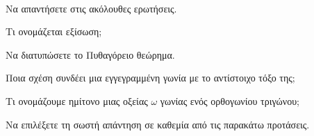 \documentclass[twoside,nofonts,internet,math,spyros]{frontisthrio-diag}
\begin{document}
\vspace{-5mm}
\begin{thema}
\item\mbox{}\\\vspace{-5mm}
\begin{erwthma}
\item Να απαντήσετε στις ακόλουθες ερωτήσεις.
\begin{alist}
\item Τι ονομάζεται εξίσωση;
\item Να διατυπώσετε το Πυθαγόρειο θεώρημα.
\item Ποια σχέση συνδέει μια εγγεγραμμένη γωνία με το αντίστοιχο τόξο της;
\item Τι ονομάζουμε ημίτονο μιας οξείας $ \omega $ γωνίας ενός ορθογωνίου τριγώνου;
\end{alist}
\item \swstolathos
\begin{alist}
\item 
\item 
\item 
\item 
\item 
\end{alist}
\item Να επιλέξετε τη σωστή απάντηση σε καθεμία από τις παρακάτω προτάσεις.
\begin{alist}
\item 
\begin{multicols}{4}
\begin{rlist}
\item 
\item 
\item 
\item 
\end{rlist}
\end{multicols}
\item 
\begin{multicols}{3}
\begin{rlist}
\item 
\item 
\item 
\end{rlist}
\end{multicols}
\item 
\begin{multicols}{4}
\begin{rlist}

\end{rlist}
\end{multicols}
\end{alist}
\end{erwthma}
\end{thema}
\end{document}
